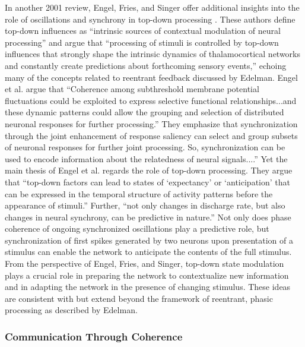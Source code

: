 In another 2001 review, Engel, Fries, and Singer offer additional insights into the role of oscillations and synchrony in top-down processing \cite{enfr2001}. These authors define top-down influences as ``intrinsic sources of contextual modulation of neural processing'' and argue that ``processing of stimuli is controlled by top-down influences that strongly shape the intrinsic dynamics of thalamocortical networks and constantly create predictions about forthcoming sensory events,'' echoing many of the concepts related to reentrant feedback discussed by Edelman. Engel et al. argue that ``Coherence among subthreshold membrane potential fluctuations could be exploited to express selective functional relationships...and these dynamic patterns could allow the grouping and selection of distributed neuronal responses for further processing.'' They emphasize that synchronization through the joint enhancement of response saliency can select and group subsets of neuronal responses for further joint processing. So, synchronization can be used to encode information about the relatedness of neural signals....'' Yet the main thesis of Engel et al. regards the role of top-down processing. They argue that ``top-down factors can lead to states of `expectancy' or `anticipation' that can be expressed in the temporal structure of activity patterns before the appearance of stimuli.'' Further, ``not only changes in discharge rate, but also changes in neural synchrony, can be predictive in nature.'' Not only does phase coherence of ongoing synchronized oscillations play a predictive role, but synchronization of first spikes generated by two neurons upon presentation of a stimulus can enable the network to anticipate the contents of the full stimulus. From the perspective of Engel, Fries, and Singer, top-down state modulation plays a crucial role in preparing the network to contextualize new information and in adapting the network in the presence of changing stimulus. These ideas are consistent with but extend beyond the framework of reentrant, phasic processing as described by Edelman.


\subsubsection{Communication Through Coherence}

